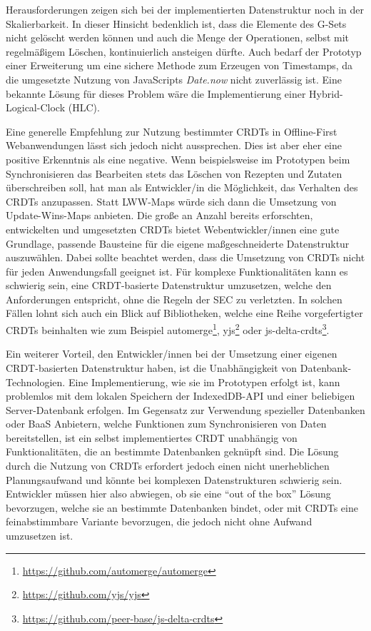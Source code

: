 \documentclass[a4paper, 12pt]{scrreprt}
\begin{document}
Herausforderungen zeigen sich bei der implementierten Datenstruktur noch in der Skalierbarkeit. In dieser Hinsicht bedenklich ist, dass die Elemente des G-Sets nicht gelöscht werden können und auch die Menge der Operationen, selbst mit regelmäßigem Löschen, kontinuierlich ansteigen dürfte. Auch bedarf der Prototyp einer Erweiterung um eine sichere Methode zum Erzeugen von Timestamps, da die umgesetzte Nutzung von JavaScripts \textit{Date.now} nicht zuverlässig ist. Eine bekannte Lösung für dieses Problem wäre die Implementierung einer Hybrid-Logical-Clock (HLC).

Eine generelle Empfehlung zur Nutzung bestimmter CRDTs in Offline-First Webanwendungen lässt sich jedoch nicht aussprechen. Dies ist aber eher eine positive Erkenntnis als eine negative. Wenn beispielsweise im Prototypen beim Synchronisieren das Bearbeiten stets das Löschen von Rezepten und Zutaten überschreiben soll, hat man als Entwickler/in die Möglichkeit, das Verhalten des CRDTs anzupassen. Statt LWW-Maps würde sich dann die Umsetzung von Update-Wins-Maps anbieten. Die große an Anzahl bereits erforschten, entwickelten und umgesetzten CRDTs bietet Webentwickler/innen eine gute Grundlage, passende Bausteine für die eigene maßgeschneiderte Datenstruktur auszuwählen. Dabei sollte beachtet werden, dass die Umsetzung von CRDTs nicht für jeden Anwendungsfall geeignet ist. Für komplexe Funktionalitäten kann es schwierig sein, eine CRDT-basierte Datenstruktur umzusetzen, welche den Anforderungen entspricht, ohne die Regeln der \ac{SEC} zu verletzten. In solchen Fällen lohnt sich auch ein Blick auf Bibliotheken, welche eine Reihe vorgefertigter CRDTs beinhalten wie zum Beispiel automerge\footnote{\url{https://github.com/automerge/automerge}}, yjs\footnote{\url{https://github.com/yjs/yjs}} oder js-delta-crdts\footnote{\url{https://github.com/peer-base/js-delta-crdts}}. 

Ein weiterer Vorteil, den Entwickler/innen bei der Umsetzung einer eigenen CRDT-basierten Datenstruktur haben, ist die Unabhängigkeit von Datenbank-Technologien. Eine Implementierung, wie sie im Prototypen erfolgt ist, kann problemlos mit dem lokalen Speichern der IndexedDB-API und einer beliebigen Server-Datenbank erfolgen. Im Gegensatz zur Verwendung spezieller Datenbanken oder \ac{BaaS} Anbietern, welche Funktionen zum Synchronisieren von Daten bereitstellen, ist ein selbst implementiertes CRDT unabhängig von Funktionalitäten, die an bestimmte Datenbanken geknüpft sind. Die Lösung durch die Nutzung von CRDTs erfordert jedoch einen nicht unerheblichen Planungsaufwand und könnte bei komplexen Datenstrukturen schwierig sein. Entwickler müssen hier also abwiegen, ob sie eine \enquote{out of the box} Lösung bevorzugen, welche sie an bestimmte Datenbanken bindet, oder mit CRDTs eine feinabstimmbare Variante bevorzugen, die jedoch nicht ohne Aufwand umzusetzen ist. 
\end{document}
